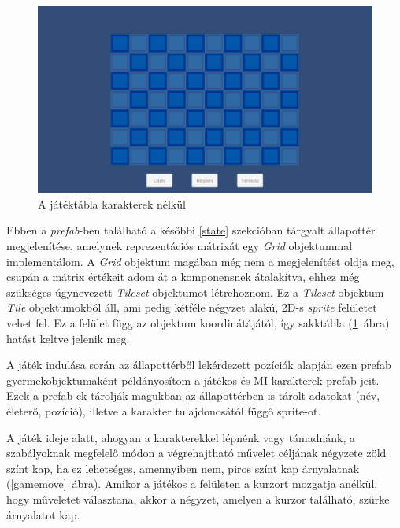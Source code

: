 \documentclass[
]{thesis-ekf}
\theoremstyle{definition}
\theoremstyle{remark}
\begin{document}
\begin{figure}[h!]
	\centering
	\includegraphics[width=13cm]{./pictures/game_grid.png}
	\caption{A játéktábla karakterek nélkül}
	\label{gamegrid}
\end{figure}

Ebben a \emph{prefab}-ben található a későbbi \ref{state} szekcióban tárgyalt állapottér megjelenítése, amelynek reprezentációs mátrixát egy \emph{Grid} objektummal implementálom. A \emph{Grid} objektum magában még nem a megjelenítést oldja meg, csupán a mátrix értékeit adom át a komponensnek átalakítva, ehhez még szükséges úgynevezett \emph{Tileset} objektumot létrehoznom. Ez a \emph{Tileset} objektum \emph{Tile} objektumokból áll, ami pedig kétféle négyzet alakú, 2D-s \emph{sprite} felületet vehet fel. Ez a felület függ az objektum koordinátájától, így sakktábla (\ref{gamegrid}~ábra) hatást keltve jelenik meg. 

A játék indulása során az állapottérből lekérdezett pozíciók alapján ezen prefab gyermekobjektumaként példányosítom a játékos és MI karakterek prefab-jeit. Ezek a prefab-ek tárolják magukban az állapottérben is tárolt adatokat (név, életerő, pozíció), illetve a karakter tulajdonosától függő sprite-ot.

A játék ideje alatt, ahogyan a karakterekkel lépnénk vagy támadnánk, a szabályoknak megfelelő módon a végrehajtható művelet céljának négyzete zöld színt kap, ha ez lehetséges, amennyiben nem, piros színt kap árnyalatnak (\ref{gamemove}~ábra). Amikor a játékos a felületen a kurzort mozgatja anélkül, hogy műveletet választana, akkor a négyzet, amelyen a kurzor található, szürke árnyalatot kap.
\end{document}
